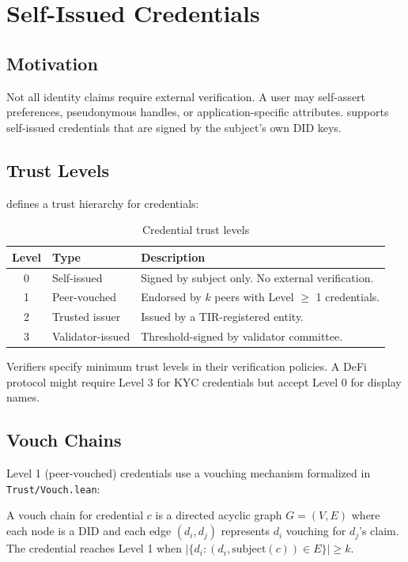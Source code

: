 \section{Self-Issued Credentials}


\subsection{Motivation}

Not all identity claims require external verification. A user may self-assert preferences, pseudonymous handles, or application-specific attributes. \IChain{} supports self-issued credentials that are signed by the subject's own DID keys.

\subsection{Trust Levels}

\IChain{} defines a trust hierarchy for credentials:

\begin{table}[h]
\centering
\begin{tabular}{clp{6cm}}
\toprule
\textbf{Level} & \textbf{Type} & \textbf{Description} \\
\midrule
0 & Self-issued & Signed by subject only. No external verification. \\
1 & Peer-vouched & Endorsed by $k$ peers with Level $\geq$ 1 credentials. \\
2 & Trusted issuer & Issued by a TIR-registered entity. \\
3 & Validator-issued & Threshold-signed by validator committee. \\
\bottomrule
\end{tabular}
\caption{Credential trust levels}
\label{tab:trust-levels}
\end{table}

Verifiers specify minimum trust levels in their verification policies. A DeFi protocol might require Level 3 for KYC credentials but accept Level 0 for display names.

\subsection{Vouch Chains}

Level 1 (peer-vouched) credentials use a vouching mechanism formalized in \texttt{Trust/Vouch.lean}:

\begin{definition}
A vouch chain for credential $c$ is a directed acyclic graph $G = (V, E)$ where each node is a DID and each edge $(d_i, d_j)$ represents $d_i$ vouching for $d_j$'s claim. The credential reaches Level 1 when $|\{d_i : (d_i, \text{subject}(c)) \in E\}| \geq k$.
\end{definition}

